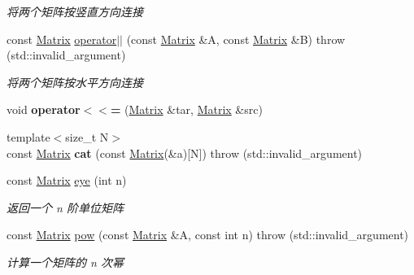 \begin{DoxyCompactItemize}
\begin{DoxyCompactList}\small\item\em 将两个矩阵按竖直方向连接 \end{DoxyCompactList}\item 
const \hyperlink{classkerbal_1_1math_1_1_matrix}{Matrix} \hyperlink{classkerbal_1_1math_1_1_matrix_aaa58ea23f11a2f1ad42b487f9a6d0245}{operator$\vert$$\vert$} (const \hyperlink{classkerbal_1_1math_1_1_matrix}{Matrix} \&A, const \hyperlink{classkerbal_1_1math_1_1_matrix}{Matrix} \&B)  throw (std\+::invalid\+\_\+argument)
\begin{DoxyCompactList}\small\item\em 将两个矩阵按水平方向连接 \end{DoxyCompactList}\item 
\mbox{\label{classkerbal_1_1math_1_1_matrix_ad6baacfd0e9f61f34af177147b55939a}} 
void {\bfseries operator$<$$<$=} (\hyperlink{classkerbal_1_1math_1_1_matrix}{Matrix} \&tar, \hyperlink{classkerbal_1_1math_1_1_matrix}{Matrix} \&src)
\item 
\mbox{\label{classkerbal_1_1math_1_1_matrix_a8b595740f508d34b7cff5e159b44bcc0}} 
{\footnotesize template$<$size\+\_\+t N$>$ }\\const \hyperlink{classkerbal_1_1math_1_1_matrix}{Matrix} {\bfseries cat} (const \hyperlink{classkerbal_1_1math_1_1_matrix}{Matrix}(\&a)\mbox{[}N\mbox{]})  throw (std\+::invalid\+\_\+argument)
\item 
const \hyperlink{classkerbal_1_1math_1_1_matrix}{Matrix} \hyperlink{classkerbal_1_1math_1_1_matrix_a66d6a7eb6b57a6e5acb75ab8b4349471}{eye} (int n)
\begin{DoxyCompactList}\small\item\em 返回一个 n 阶单位矩阵 \end{DoxyCompactList}\item 
const \hyperlink{classkerbal_1_1math_1_1_matrix}{Matrix} \hyperlink{classkerbal_1_1math_1_1_matrix_a35bd334cc41142e574a3261853fd14d2}{pow} (const \hyperlink{classkerbal_1_1math_1_1_matrix}{Matrix} \&A, const int n)  throw (std\+::invalid\+\_\+argument)
\begin{DoxyCompactList}\small\item\em 计算一个矩阵的 n 次幂 \end{DoxyCompactList}\item 
\mbox{\label{classkerbal_1_1math_1_1_matrix_ab5a14c5b61c616fa699113c704c046c4}} 

\end{DoxyCompactItemize}
